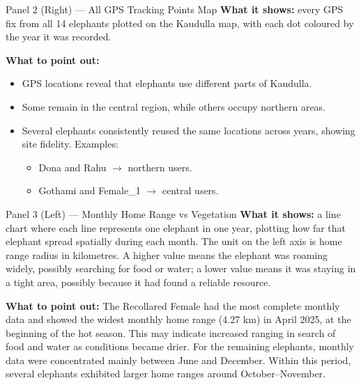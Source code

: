 \documentclass{beamer}
\begin{document}
	
	
	
	
	
	
	\begin{frame}{Panel 2 (Right) --- All GPS Tracking Points Map}
		\textbf{What it shows:} every GPS fix from all 14 elephants plotted on the
		Kaudulla map, with each dot coloured by the year it was recorded.
		
		
		
		\vspace{6pt}
		\textbf{What to point out:}
		\begin{itemize}
			\item GPS locations reveal that elephants use different parts of Kaudulla.
			\item Some remain in the central region, while others occupy northern areas.
			\item Several elephants consistently reused the same locations across
			years, showing site fidelity. Examples:
			\begin{itemize}
				\item Dona and Rahu $\rightarrow$ northern users.
				\item Gothami and Female\_1 $\rightarrow$ central users.
			\end{itemize}
		\end{itemize}
	\end{frame}
	
	
	
	
	
	
	
	\begin{frame}{Panel 3 (Left) --- Monthly Home Range vs Vegetation}
		\textbf{What it shows:} a line chart where each line represents one elephant
		in one year, plotting how far that elephant spread spatially during each
		month. The unit on the left axis is home range radius in kilometres. A
		higher value means the elephant was roaming widely, possibly searching for
		food or water; a lower value means it was staying in a tight area, possibly
		because it had found a reliable resource.
		
		\vspace{6pt}
		\textbf{What to point out:}
		The Recollared Female had the most complete monthly data and showed the widest monthly home range (4.27 km) in April 2025, at the beginning of the hot season. This may indicate increased ranging in search of food and water as conditions became drier. For the remaining elephants, monthly data were concentrated mainly between June and December. Within this period, several elephants exhibited larger home ranges around October–November.
	\end{frame}
	
\end{document}
